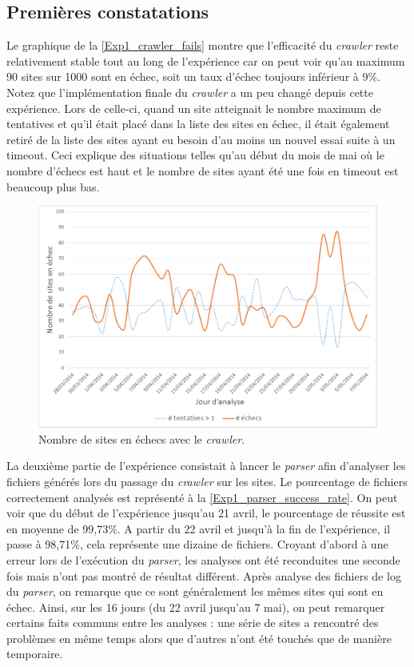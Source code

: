 \subsection{Premières constatations}
Le graphique de la \autoref{Exp1_crawler_fails} montre que l'efficacité du \textit{crawler} reste relativement stable tout au long de l'expérience car on peut voir qu'au maximum 90 sites sur 1000 sont en échec, soit un taux d'échec toujours inférieur à 9\%.
Notez que l'implémentation finale du \textit{crawler} a un peu changé depuis cette expérience. Lors de celle-ci, quand un site atteignait le nombre maximum de tentatives et qu'il était placé dans la liste des sites en échec, il était également retiré de la liste des sites ayant eu besoin d'au moins un nouvel essai suite à un timeout. Ceci explique des situations telles qu'au début du mois de mai où le nombre d'échecs est haut et le nombre de sites ayant été une fois en timeout est beaucoup plus bas.

\begin{figure}[!h]
	\centering
	\includegraphics[scale=.6]{Exp_40jours/Exp1_crawler_fails.png}
	\caption{\label{Exp1_crawler_fails}Nombre de sites en échecs avec le \textit{crawler}.}
\end{figure}

La deuxième partie de l'expérience consistait à lancer le \textit{parser} afin d'analyser les fichiers générés lors du passage du \textit{crawler} sur les sites.
Le pourcentage de fichiers correctement analysés est représenté à la \autoref{Exp1_parser_success_rate}. On peut voir que du début de l'expérience jusqu'au 21 avril, le pourcentage de réussite est en moyenne de 99,73\%. A partir du 22 avril et jusqu'à la fin de l'expérience, il passe à 98,71\%, cela représente une dizaine de fichiers.
Croyant d'abord à une erreur lors de l'exécution du \textit{parser}, les analyses ont été reconduites une seconde fois mais n'ont pas montré de résultat différent.
Après analyse des fichiers de log du \textit{parser}, on remarque que ce sont généralement les mêmes sites qui sont en échec.
Ainsi, sur les 16 jours (du 22 avril jusqu'au 7 mai), on peut remarquer certains faits communs entre les analyses : une série de sites a rencontré des problèmes en même temps alors que d'autres n'ont été touchés que de manière temporaire.
\newline

